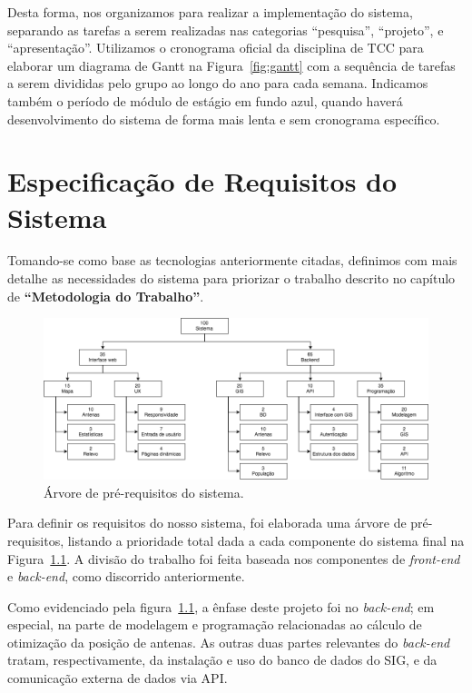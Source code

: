 \documentclass[]{politex}
\begin{document}
Desta forma, nos organizamos para realizar a implementação do sistema, separando
as tarefas a serem realizadas nas categorias ``pesquisa'', ``projeto'', e
``apresentação''. Utilizamos o cronograma oficial da disciplina de TCC para
elaborar um diagrama de Gantt na Figura~\ref{fig:gantt} com a sequência de
tarefas a serem divididas pelo grupo ao longo do ano para cada semana. Indicamos
também o período de módulo de estágio em fundo azul, quando haverá
desenvolvimento do sistema de forma mais lenta e sem cronograma específico.

\chapter{Especificação de Requisitos do Sistema}

Tomando-se como base as tecnologias anteriormente citadas, definimos com mais
detalhe as necessidades do sistema para priorizar o trabalho descrito no
capítulo de \textbf{``Metodologia do Trabalho''}.

\begin{figure}[H]
    \centering
    \includegraphics[width=6in]{imagens/arvore_prerequisitos}
    \caption{Árvore de pré-requisitos do sistema.}
    \label{fig:arvore_prerequisitos}
\end{figure}

Para definir os requisitos do nosso sistema, foi elaborada uma árvore de
pré-requisitos, listando a prioridade total dada a cada componente do sistema
final na Figura~\ref{fig:arvore_prerequisitos}. A divisão do trabalho foi feita
baseada nos componentes de \textit{front-end} e \textit{back-end}, como
discorrido anteriormente.

Como evidenciado pela figura~\ref{fig:arvore_prerequisitos}, a ênfase deste
projeto foi no \textit{back-end}; em especial, na parte de modelagem e
programação relacionadas ao cálculo de otimização da posição de antenas. As
outras duas partes relevantes do \textit{back-end} tratam, respectivamente, da
instalação e uso do banco de dados do SIG, e da comunicação externa de dados via
API.
\end{document}
